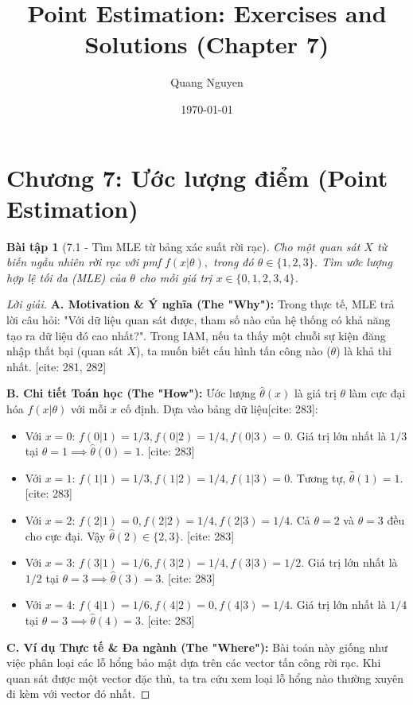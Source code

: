 \documentclass[8pt,a4paper]{article}
\title{Point Estimation: Exercises and Solutions (Chapter 7)}
\author{Quang Nguyen}
\date{\today}
\newtheorem{exercise}{Bài tập}
\newenvironment{solution}{\begin{proof}[Lời giải]}{\end{proof}}
\begin{document}
\maketitle

\section*{Chương 7: Ước lượng điểm (Point Estimation)}

\begin{exercise}[7.1 - Tìm MLE từ bảng xác suất rời rạc]
Cho một quan sát $X$ từ biến ngẫu nhiên rời rạc với pmf $f(x|\theta),$ trong đó $\theta \in \{1,2,3\}$. Tìm ước lượng hợp lệ tối đa (MLE) của $\theta$ cho mỗi giá trị $x \in \{0, 1, 2, 3, 4\}$.
\end{exercise}

\begin{solution}
\textbf{A. Motivation \& Ý nghĩa (The "Why"):} Trong thực tế, MLE trả lời câu hỏi: "Với dữ liệu quan sát được, tham số nào của hệ thống có khả năng tạo ra dữ liệu đó cao nhất?". Trong IAM, nếu ta thấy một chuỗi sự kiện đăng nhập thất bại (quan sát $X$), ta muốn biết cấu hình tấn công nào ($\theta$) là khả thi nhất. [cite: 281, 282]

\textbf{B. Chi tiết Toán học (The "How"):}
Ước lượng $\hat{\theta}(x)$ là giá trị $\theta$ làm cực đại hóa $f(x|\theta)$ với mỗi $x$ cố định. Dựa vào bảng dữ liệu[cite: 283]:
\begin{itemize}
    \item Với $x=0$: $f(0|1) = 1/3, f(0|2) = 1/4, f(0|3) = 0$. Giá trị lớn nhất là $1/3$ tại $\theta=1 \implies \hat{\theta}(0) = 1$. [cite: 283]
    \item Với $x=1$: $f(1|1) = 1/3, f(1|2) = 1/4, f(1|3) = 0$. Tương tự, $\hat{\theta}(1) = 1$. [cite: 283]
    \item Với $x=2$: $f(2|1) = 0, f(2|2) = 1/4, f(2|3) = 1/4$. Cả $\theta=2$ và $\theta=3$ đều cho cực đại. Vậy $\hat{\theta}(2) \in \{2, 3\}$. [cite: 283]
    \item Với $x=3$: $f(3|1) = 1/6, f(3|2) = 1/4, f(3|3) = 1/2$. Giá trị lớn nhất là $1/2$ tại $\theta=3 \implies \hat{\theta}(3) = 3$. [cite: 283]
    \item Với $x=4$: $f(4|1) = 1/6, f(4|2) = 0, f(4|3) = 1/4$. Giá trị lớn nhất là $1/4$ tại $\theta=3 \implies \hat{\theta}(4) = 3$. [cite: 283]
\end{itemize}

\textbf{C. Ví dụ Thực tế \& Đa ngành (The "Where"):} Bài toán này giống như việc phân loại các lỗ hổng bảo mật dựa trên các vector tấn công rời rạc. Khi quan sát được một vector đặc thù, ta tra cứu xem loại lỗ hổng nào thường xuyên đi kèm với vector đó nhất.
\end{solution}
\end{document}
